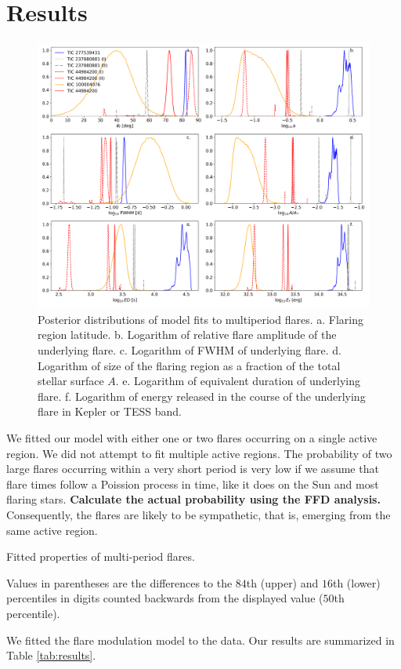 \documentclass[fleqn,usenatbib,letters]{mnras}%
\begin{document}
\section{Results}
\begin{figure}
	\includegraphics[width=\hsize]{figures/12_08_2020_posteriors.png}
    \caption{Posterior distributions of model fits to multiperiod flares. a. Flaring region latitude. b. Logarithm of relative flare amplitude of the underlying flare. c. Logarithm of FWHM of underlying flare. d. Logarithm of size of the flaring region as a fraction of the total stellar surface $A$. e. Logarithm of equivalent duration of underlying flare. f. Logarithm of energy released in the course of the underlying flare in Kepler or TESS band.}
    \label{fig:posteriors}
\end{figure}

We fitted our model with either one or two flares occurring on a single active region. We did not attempt to fit multiple active regions. The probability of two large flares occurring within a very short period is very low if we assume that flare times follow a Poission process in time, like it does on the Sun and most flaring stars. \textbf{Calculate the actual probability using the FFD analysis.} Consequently, the flares are likely to be sympathetic, that is, emerging from the same active region.

\label{sec:results}

\begin{table}
\centering
\caption{Fitted properties of multi-period flares.}
\label{tab:stars}

Values in parentheses are the differences to the $84$th (upper) and $16$th (lower) percentiles in digits counted backwards from the displayed value ($50$th percentile).
\end{table}
We fitted the flare modulation model to the data. Our results are summarized in Table \ref{tab:results}.
\end{document}
